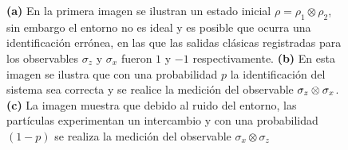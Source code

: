 \begin{figure}[H]
\begin{subfigure}{0.4\textwidth}
  \centering
{}
\hfill
\caption{}
\end{subfigure}
\caption{\textbf{(a)} En la primera imagen se ilustran un estado inicial $\rho= \rho_1\otimes \rho_2$, sin embargo el entorno no es ideal y es posible que ocurra una identificación errónea, en las que las salidas clásicas registradas para los observables $\sigma_z$ y $\sigma_x$ fueron $1$ y $-1$ respectivamente.\textbf{ (b)} En esta imagen se ilustra que con una probabilidad $p$ la identificación del sistema sea correcta y se realice la medición del observable $\sigma_z\otimes \sigma_x$.\textbf{ (c)} La imagen muestra que debido al ruido del entorno, las partículas experimentan un intercambio y con una probabilidad $(1-p)$ se realiza la medición del observable $\sigma_x\otimes \sigma_z$ }\label{diagrama-cajas}
\end{figure}
